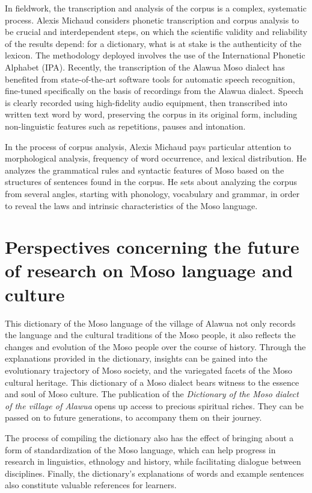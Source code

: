 In fieldwork, the transcription and analysis of the corpus is a complex, systematic process. Alexis Michaud considers phonetic transcription and corpus analysis to be crucial and interdependent steps, on which the scientific validity and reliability of the results depend: for a dictionary, what is at stake is the authenticity of the lexicon. The methodology deployed involves the use of the International Phonetic Alphabet (IPA). Recently, the transcription of the Alawua Moso dialect has benefited from state-of-the-art software tools for automatic speech recognition, fine-tuned specifically on the basis of recordings from the Alawua dialect. Speech is clearly recorded using high-fidelity audio equipment, then transcribed into written text word by word, preserving the corpus in its original form, including non-linguistic features such as repetitions, pauses and intonation.

In the process of corpus analysis, Alexis Michaud pays particular attention to morphological analysis, frequency of word occurrence, and lexical distribution. He analyzes the grammatical rules and syntactic features of Moso based on the structures of sentences found in the corpus. He sets about analyzing the corpus from several angles, starting with phonology, vocabulary and grammar, in order to reveal the laws and intrinsic characteristics of the Moso language.

\section*{Perspectives concerning the future of research on Moso language and culture}

This dictionary of the Moso language of the village of Alawua not only records the language and the cultural traditions of the Moso people, it also reflects the changes and evolution of the Moso people over the course of history. Through the explanations provided in the dictionary, insights can be gained into the evolutionary trajectory of Moso society, and the variegated facets of the Moso cultural heritage. This dictionary of a Moso dialect bears witness to the essence and soul of Moso culture. The publication of the \emph{Dictionary of the Moso dialect of the village of Alawua} opens up access to precious spiritual riches. They can be passed on to future generations, to accompany them on their journey.

The process of compiling the dictionary also has the effect of bringing about a form of standardization of the Moso language, which can help progress in research in linguistics, ethnology and history, while facilitating dialogue between disciplines. Finally, the dictionary's explanations of words and example sentences also constitute valuable references for learners.

